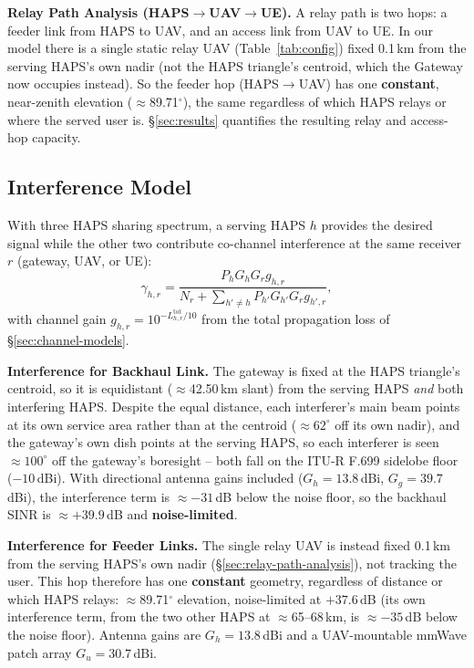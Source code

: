 \documentclass[]{ieeeaccess}
\begin{document}
\label{sec:relay-path-analysis}

\textbf{Relay Path Analysis (HAPS$\to$UAV$\to$UE).} A relay path is two hops: a feeder link from HAPS to UAV, and an access link from UAV to UE. In our model there is a single static relay UAV (Table~\ref{tab:config}) fixed 0.1\,km from the serving HAPS's own nadir (not the HAPS triangle's centroid, which the Gateway now occupies instead). So the feeder hop (HAPS$\to$UAV) has one \textbf{constant}, near-zenith elevation ($\approx$89.71$^\circ$), the same regardless of which HAPS relays or where the served user is. \S\ref{sec:results} quantifies the resulting relay and access-hop capacity.

\subsection{Interference Model}
\label{sec:multihaps}

With three HAPS sharing spectrum, a serving HAPS $h$ provides the desired signal while the other two contribute co-channel interference at the same receiver $r$ (gateway, UAV, or UE):
\begin{equation}
\gamma_{h,r}=\frac{P_hG_hG_r g_{h,r}}{N_r + \displaystyle\sum_{h'\neq h}P_{h'}G_{h'}G_r g_{h',r}},
\label{eq:general-haps-sinr}
\end{equation}
with channel gain $g_{h,r}=10^{-L_{h,r}^\mathrm{tot}/10}$ from the total propagation loss of \S\ref{sec:channel-models}.

\textbf{Interference for Backhaul Link.} The gateway is fixed at the HAPS triangle's centroid, so it is equidistant ($\approx$42.50\,km slant) from the serving HAPS \emph{and} both interfering HAPS. Despite the equal distance, each interferer's main beam points at its own service area rather than at the centroid ($\approx62^\circ$ off its own nadir), and the gateway's own dish points at the serving HAPS, so each interferer is seen $\approx100^\circ$ off the gateway's boresight -- both fall on the ITU-R F.699 sidelobe floor ($-10$\,dBi). With directional antenna gains included ($G_h=13.8$\,dBi, $G_g=39.7$\,dBi), the interference term is $\approx-31$\,dB below the noise floor, so the backhaul SINR is $\approx+39.9$\,dB and \textbf{noise-limited}.

\textbf{Interference for Feeder Links.} The single relay UAV is instead fixed 0.1\,km from the serving HAPS's own nadir (\S\ref{sec:relay-path-analysis}), not tracking the user. This hop therefore has one \textbf{constant} geometry, regardless of distance or which HAPS relays: $\approx$89.71$^\circ$ elevation, noise-limited at $+37.6$\,dB (its own interference term, from the two other HAPS at $\approx$65--68\,km, is $\approx-35$\,dB below the noise floor). Antenna gains are $G_h=13.8$\,dBi and a UAV-mountable mmWave patch array $G_u=30.7$\,dBi.
\end{document}
